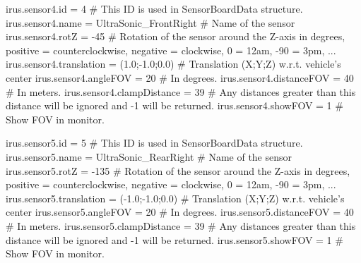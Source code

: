 irus.sensor4.id = 4                        # This ID is used in SensorBoardData structure.
irus.sensor4.name = UltraSonic_FrontRight  # Name of the sensor
irus.sensor4.rotZ = -45                    # Rotation of the sensor around the Z-axis in degrees, positive = counterclockwise, negative = clockwise, 0 = 12am, -90 = 3pm, ...
irus.sensor4.translation = (1.0;-1.0;0.0)  # Translation (X;Y;Z) w.r.t. vehicle's center
irus.sensor4.angleFOV = 20                 # In degrees.
irus.sensor4.distanceFOV = 40              # In meters.
irus.sensor4.clampDistance = 39            # Any distances greater than this distance will be ignored and -1 will be returned.
irus.sensor4.showFOV = 1                   # Show FOV in monitor.

irus.sensor5.id = 5                        # This ID is used in SensorBoardData structure.
irus.sensor5.name = UltraSonic_RearRight   # Name of the sensor
irus.sensor5.rotZ = -135                   # Rotation of the sensor around the Z-axis in degrees, positive = counterclockwise, negative = clockwise, 0 = 12am, -90 = 3pm, ...
irus.sensor5.translation = (-1.0;-1.0;0.0) # Translation (X;Y;Z) w.r.t. vehicle's center
irus.sensor5.angleFOV = 20                 # In degrees.
irus.sensor5.distanceFOV = 40              # In meters.
irus.sensor5.clampDistance = 39            # Any distances greater than this distance will be ignored and -1 will be returned.
irus.sensor5.showFOV = 1                   # Show FOV in monitor.


